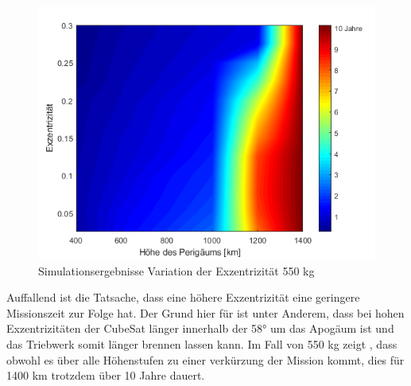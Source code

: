 \begin{figure}[h!]
	\centering
		\includegraphics[width=1.00\textwidth]{./graphics/GMAT/ecc_perigee_550kg.png}
		\caption{Simulationsergebnisse Variation der Exzentrizität 550 kg}
	\label{fig:GMAT_ecc_c}
\end{figure}


Auffallend ist die Tatsache, dass eine höhere Exzentrizität eine geringere Missionszeit zur Folge hat. Der Grund hier für ist unter Anderem, dass bei hohen Exzentrizitäten der CubeSat länger innerhalb der 58° um das Apogäum ist und das Triebwerk somit länger brennen lassen kann. Im Fall von 550 kg zeigt , dass obwohl es über alle Höhenstufen zu einer verkürzung der Mission kommt, dies für 1400 km trotzdem über 10 Jahre dauert.



